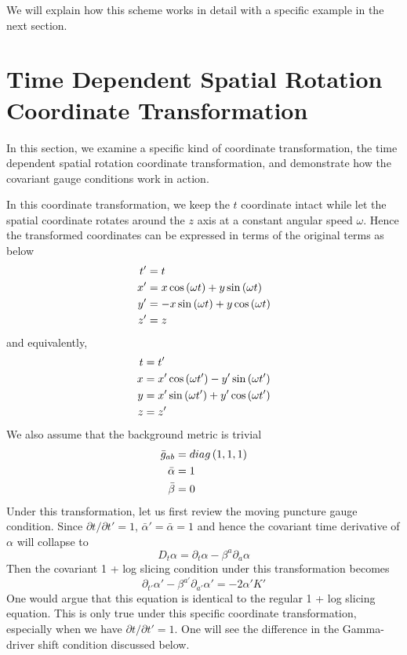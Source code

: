 We will explain how this scheme works in detail with a specific example in the next section. 

\section{Time Dependent Spatial Rotation Coordinate Transformation}\label{example}
In this section, we examine a specific kind of coordinate transformation, the time dependent spatial rotation coordinate transformation, and demonstrate how the covariant gauge conditions work in action. 

In this coordinate transformation, we keep the $t$ coordinate intact while let the spatial coordinate rotates around the $z$ axis at a constant angular speed $\omega$. Hence the transformed coordinates can be expressed in terms of the original terms as below
\begin{align}
t' & = t\notag\\
x' & = x \cos\left(\omega t\right) + y\sin\left(\omega t\right)\notag\\
y' & = -x\sin\left(\omega t\right) + y\cos\left(\omega t\right)\notag\\
z' & = z
\end{align}
and equivalently, 
\begin{align}
t & = t'\notag\\
x & = x'\cos\left(\omega t'\right) - y'\sin\left(\omega t'\right)\notag\\
y & = x'\sin\left(\omega t'\right) + y'\cos\left(\omega t'\right)\notag\\
z & = z'
\end{align}
We also assume that the background metric is trivial
\begin{align}
{\bar g}_{ab} & = diag\left(1,1,1\right)\notag\\
{\bar \alpha} & = 1\notag\\
{\bar \beta} & = 0 
\end{align}
Under this transformation, let us first review the moving puncture gauge condition. Since $\partial t/\partial t' = 1$, ${\bar \alpha}' = {\bar \alpha} = 1$ and hence the covariant time derivative of $\alpha$ will collapse to
\begin{equation}
D_{t}\alpha = \partial_{t}\alpha - \beta^{a}\partial_{a}\alpha
\end{equation}
Then the covariant 1 + log slicing condition under this transformation becomes
\begin{equation}\label{transformed 1 + log slicing}
\partial_{t'}\alpha' - \beta^{a'}\partial_{a'}\alpha' = -2\alpha'K'
\end{equation}
One would argue that this equation is identical to the regular 1 + log slicing equation. This is only true under this specific coordinate transformation, especially when we have $\partial t/\partial t' = 1$. One will see the difference in the Gamma-driver shift condition discussed below. 

